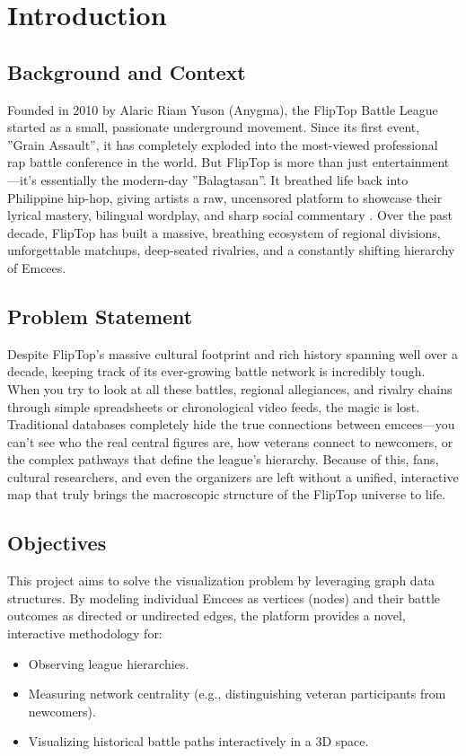 \documentclass[12pt,a4paper]{article}
\begin{document}
\newpage
\tableofcontents
\newpage

\section{Introduction}

\subsection{Background and Context}
Founded in 2010 by Alaric Riam Yuson (Anygma), the FlipTop Battle League started as a small, passionate underground movement. Since its first event, ''Grain Assault'', it has completely exploded into the most-viewed professional rap battle conference in the world. But FlipTop is more than just entertainment---it's essentially the modern-day ''Balagtasan''. It breathed life back into Philippine hip-hop, giving artists a raw, uncensored platform to showcase their lyrical mastery, bilingual wordplay, and sharp social commentary \cite{fliptop_official}. Over the past decade, FlipTop has built a massive, breathing ecosystem of regional divisions, unforgettable matchups, deep-seated rivalries, and a constantly shifting hierarchy of Emcees.

\subsection{Problem Statement}
Despite FlipTop's massive cultural footprint and rich history spanning well over a decade, keeping track of its ever-growing battle network is incredibly tough. When you try to look at all these battles, regional allegiances, and rivalry chains through simple spreadsheets or chronological video feeds, the magic is lost. Traditional databases completely hide the true connections between emcees---you can't see who the real central figures are, how veterans connect to newcomers, or the complex pathways that define the league's hierarchy. Because of this, fans, cultural researchers, and even the organizers are left without a unified, interactive map that truly brings the macroscopic structure of the FlipTop universe to life.

\subsection{Objectives}
This project aims to solve the visualization problem by leveraging graph data structures. By modeling individual Emcees as vertices (nodes) and their battle outcomes as directed or undirected edges, the platform provides a novel, interactive methodology for:
\begin{itemize}
    \item Observing league hierarchies.
    \item Measuring network centrality (e.g., distinguishing veteran participants from newcomers).
    \item Visualizing historical battle paths interactively in a 3D space.
\end{itemize}
\end{document}
